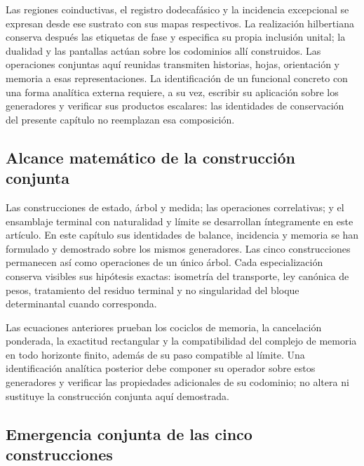 Las regiones coinductivas, el registro
dodecafásico y la incidencia excepcional
se expresan desde ese sustrato con sus mapas
respectivos. La realización hilbertiana conserva después las etiquetas de
fase y especifica su propia inclusión unital; la dualidad y las pantallas
actúan sobre los codominios allí construidos. Las operaciones conjuntas aquí
reunidas transmiten historias, hojas, orientación y memoria a esas
representaciones. La identificación de un funcional concreto con una forma
analítica externa requiere, a su vez, escribir su aplicación sobre los
generadores y verificar sus productos escalares: las identidades de
conservación del presente capítulo no reemplazan esa composición.

\subsection{Alcance matemático de la construcción conjunta}
Las construcciones de estado, árbol y medida; las operaciones correlativas; y
el ensamblaje terminal con naturalidad y límite se desarrollan íntegramente
en este artículo. En este capítulo sus identidades de
balance, incidencia y memoria se han formulado y demostrado sobre los mismos
generadores. Las cinco construcciones permanecen así como operaciones de un
único árbol. Cada especialización conserva visibles sus hipótesis exactas:
isometría del transporte, ley canónica de pesos, tratamiento del residuo
terminal y no singularidad del bloque determinantal cuando corresponda.

Las ecuaciones anteriores prueban los cociclos de memoria, la cancelación
ponderada, la exactitud rectangular y la compatibilidad del complejo de
memoria en todo horizonte finito, además de su paso compatible al límite.
Una identificación analítica posterior debe componer su operador sobre estos
generadores y verificar las propiedades adicionales de su codominio; no
altera ni sustituye la construcción conjunta aquí demostrada.

\iffalse
\subsection{Emergencia conjunta de las cinco construcciones}
\label{hmtfg:base:sec:cinco-construcciones-continuo-ch}

